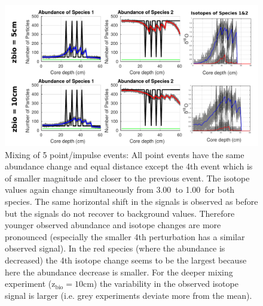 \documentclass[a4paper,oneside,9pt]{article}
\begin{document}
\begin{figure}[hbp]
\begin{center}
	\includegraphics[width=1.0\textwidth]{../figures/../figures/5point_event_5+10cm_background.pdf}
	\caption{Mixing of 5 point/impulse events: All point events have the same abundance change and equal distance except the 4th event which is of smaller magnitude and closer to the previous event. 
	The isotope values again change simultaneously from 3.00\textperthousand\ to 1.00\textperthousand\ for both species. The same horizontal shift in the signals is observed as before but the signals do not recover to background values. 
	Therefore younger observed abundance and isotope changes are more pronounced (especially the smaller 4th perturbation has a similar observed signal). In the red species (where the abundance is decreased) 
	the 4th isotope change seems to be the largest because here the abundance decrease is smaller. 
	For the deeper mixing experiment (z$_\mathrm{bio}=10$cm) the variability in the observed isotope signal is larger (i.e. grey experiments deviate more from the mean).
}\label{fig:5pointevent}
\end{center}
\end{figure}
\end{document}
